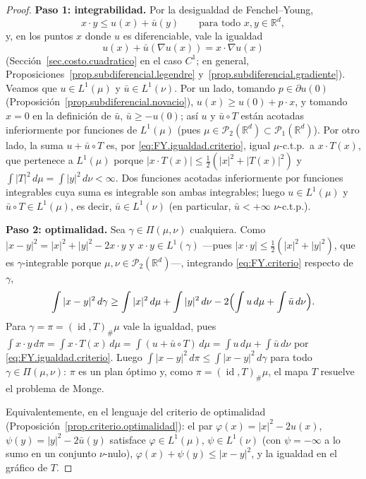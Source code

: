\documentclass[12pt, a4paper]{amsbook}
\newcommand{\id}{\operatorname{id}}
\newcommand{\R}{{\mathbb R}}
\theoremstyle{remark}
\theoremstyle{definition}
\numberwithin{section}{chapter}
\numberwithin{subsection}{section}
\numberwithin{equation}{section}
\numberwithin{figure}{chapter}
\begin{document}
\begin{proof}
\textbf{Paso 1: integrabilidad.} Por la desigualdad de Fenchel--Young,
\begin{equation}\label{eq:FY.criterio}
x\cdot y\le u(x)+\bar u(y)
\qquad\text{para todo }x,y\in\R^d,
\end{equation}
y, en los puntos $x$ donde $u$ es diferenciable, vale la igualdad
\begin{equation}\label{eq:FY.igualdad.criterio}
u(x)+\bar u(\nabla u(x))=x\cdot\nabla u(x)
\end{equation}
(Sección~\ref{sec.costo.cuadratico} en el caso $C^1$; en general,
Proposiciones~\ref{prop.subdiferencial.legendre}
y~\ref{prop.subdiferencial.gradiente}). Veamos que $u\in L^1(\mu)$ y
$\bar u\in L^1(\nu)$. Por un lado, tomando $p\in\partial u(0)$
(Proposición~\ref{prop.subdiferencial.novacio}), $u(x)\ge u(0)+p\cdot x$, y
tomando $x=0$ en la definición de $\bar u$, $\bar u\ge-u(0)$; así $u$ y
$\bar u\circ T$ están acotadas inferiormente por funciones de $L^1(\mu)$
(pues $\mu\in\mathcal P_2(\R^d)\subset\mathcal P_1(\R^d)$). Por otro lado, la
suma $u+\bar u\circ T$ es, por \eqref{eq:FY.igualdad.criterio}, igual
$\mu$-c.t.p.\ a $x\cdot T(x)$, que pertenece a $L^1(\mu)$ porque
$|x\cdot T(x)|\le\frac12(|x|^2+|T(x)|^2)$ y
$\int|T|^2\,d\mu=\int|y|^2\,d\nu<\infty$. Dos funciones acotadas
inferiormente por funciones integrables cuya suma es integrable son ambas
integrables; luego $u\in L^1(\mu)$ y $\bar u\circ T\in L^1(\mu)$, es decir,
$\bar u\in L^1(\nu)$ (en particular, $\bar u<+\infty$ $\nu$-c.t.p.).

\medskip
\textbf{Paso 2: optimalidad.} Sea $\gamma\in\Pi(\mu,\nu)$ cualquiera. Como
$|x-y|^2=|x|^2+|y|^2-2x\cdot y$ y $x\cdot y\in L^1(\gamma)$ —pues
$|x\cdot y|\le\frac12(|x|^2+|y|^2)$, que es $\gamma$-integrable porque
$\mu,\nu\in\mathcal P_2(\R^d)$—, integrando
\eqref{eq:FY.criterio} respecto de $\gamma$,
\[
\int|x-y|^2\,d\gamma
\ge\int|x|^2\,d\mu+\int|y|^2\,d\nu-2\Bigl(\int u\,d\mu+\int\bar u\,d\nu\Bigr).
\]
Para $\gamma=\pi=(\id,T)_\#\mu$ vale la igualdad, pues
$\int x\cdot y\,d\pi=\int x\cdot T(x)\,d\mu=\int(u+\bar u\circ T)\,d\mu
=\int u\,d\mu+\int\bar u\,d\nu$ por \eqref{eq:FY.igualdad.criterio}. Luego
$\int|x-y|^2\,d\pi\le\int|x-y|^2\,d\gamma$ para todo $\gamma\in\Pi(\mu,\nu)$:
$\pi$ es un plan óptimo y, como $\pi=(\id,T)_\#\mu$, el mapa $T$ resuelve el
problema de Monge.

Equivalentemente, en el lenguaje del criterio de optimalidad
(Proposición~\ref{prop.criterio.optimalidad}): el par
$\varphi(x)=|x|^2-2u(x)$, $\psi(y)=|y|^2-2\bar u(y)$ satisface
$\varphi\in L^1(\mu)$, $\psi\in L^1(\nu)$ (con $\psi=-\infty$ a lo sumo en un
conjunto $\nu$-nulo), $\varphi(x)+\psi(y)\le|x-y|^2$, y la igualdad en el
gráfico de $T$.
\end{proof}
\end{document}
